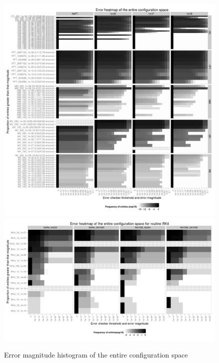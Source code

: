 \documentclass{sig-alternate}
\begin{document}
\begin{figure}[ht!]
\centering
\includegraphics[width=1.00\columnwidth]{figs/4_1_1_Exp2_2_Heatmap_Error_ConfSpace.png}
\includegraphics[width=1.00\columnwidth]{figs/4_1_1_Exp2_2_Heatmap_Error_ConfSpace_RK4.png}
\caption{Error magnitude histogram of the entire configuration space}
\end{figure}
\end{document}
